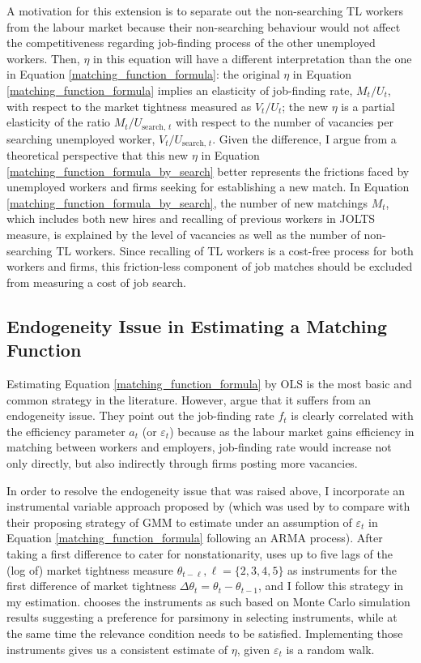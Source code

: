 \documentclass[a4paper, 11pt, tikz]{article}
\begin{document}
A motivation for this extension is to separate out the non-searching TL workers from the labour market because their non-searching behaviour would not affect the competitiveness regarding job-finding process of the other unemployed workers.
Then, $\eta$ in this equation will have a different interpretation than the one in Equation \ref{matching_function_formula}:
the original $\eta$ in Equation \ref{matching_function_formula} implies an elasticity of job-finding rate, $M_t / U_t$, with respect to the market tightness measured as $V_t / U_t$;
the new $\eta$ is a partial elasticity of the ratio $M_t / U_{\text{search, }t}$ with respect to the number of vacancies per searching unemployed worker, $V_t / U_{\text{search, }t}$.
Given the difference, I argue from a theoretical perspective that this new $\eta$ in Equation \ref{matching_function_formula_by_search} better represents the frictions faced by unemployed workers and firms seeking for establishing a new match.
In Equation \ref{matching_function_formula_by_search}, the number of new matchings $M_t$, which includes both new hires and recalling of previous workers in JOLTS measure, is explained by the level of vacancies as well as the number of non-searching TL workers.
Since recalling of TL workers is a cost-free process for both workers and firms, this friction-less component of job matches should be excluded from measuring a cost of job search.

\subsection{Endogeneity Issue in Estimating a Matching Function}
Estimating Equation \ref{matching_function_formula} by OLS is the most basic and common strategy in the literature.
However, \cite{borowczyk-martins2013accounting} argue that it suffers from an endogeneity issue.
They point out the job-finding rate $f_t$ is clearly correlated with the efficiency parameter $a_t$ (or $\varepsilon_t$) because as the labour market gains efficiency in matching between workers and employers, job-finding rate would increase not only directly, but also indirectly through firms posting more vacancies.

In order to resolve the endogeneity issue that was raised above, I incorporate an instrumental variable approach proposed by \cite{yashiv2000determinants} (which was used by \cite{borowczyk-martins2013accounting} to compare with their proposing strategy of GMM to estimate under an assumption of $\varepsilon_t$ in Equation \ref{matching_function_formula} following an ARMA process).
After taking a first difference to cater for nonstationarity, \cite{yashiv2000determinants} uses up to five lags of the (log of) market tightness measure $\theta_{t - \ell}, \ell = \{2, 3, 4, 5\}$ as instruments for the first difference of market tightness $\Delta\theta_t = \theta_t - \theta_{t - 1}$, and I follow this strategy in my estimation.
\cite{yashiv2000determinants} chooses the instruments as such based on Monte Carlo simulation results suggesting a preference for parsimony in selecting instruments, while at the same time the relevance condition needs to be satisfied.
Implementing those instruments gives us a consistent estimate of $\eta$, given $\varepsilon_t$ is a random walk.
\end{document}

